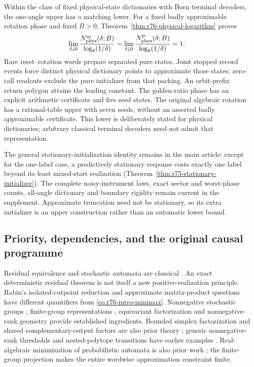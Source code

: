 Within the class of fixed physical-state dictionaries with Born terminal
decoders, the one-angle upper has a matching lower. For a fixed badly
approximable rotation phase and fixed $B>0$,
Theorem~\ref{thm:r76-physical-logarithm} proves
\[
 \lim_{\delta\downarrow0}
 \frac{N_{\rm phys}^{\rm m}(\delta;B)}{\log_8(1/\delta)}
 =\lim_{\delta\downarrow0}
 \frac{N_{\rm phys}^{\rm p}(\delta;B)}{\log_8(1/\delta)}=1.
\]
Rare reset--rotation words prepare separated pure states. Joint stopped
record events force distinct physical dictionary points to approximate
those states; zero-call readouts exclude the pure initializer from that
packing. An orbit-prefix return polygon attains the leading constant.
The golden-ratio phase has an explicit arithmetic certificate and five
seed states. The original algebraic rotation has a rational-table upper
with seven seeds, without an asserted badly approximable certificate.
This lower is deliberately stated for physical dictionaries; arbitrary
classical terminal decoders need not admit that representation.

The general stationary-initialization identity remains in the main
article: except for the one-label case, a predictively stationary
response costs exactly one label beyond its least mixed-start
realization (Theorem~\ref{thm:r75-stationary-initializer}). The complete
noisy-instrument laws, exact sector and worst-phase counts, all-angle
dictionary and boundary rigidity remain current in the supplement.
Approximate truncation need not be stationary, so its extra initializer
is an upper construction rather than an automatic lower bound.

\subsection*{Priority, dependencies, and the original causal programme}

Residual equivalence and stochastic automata are classical
\cite{RabinScott59,Rabin63,Heller65,CarlylePaz71}. An exact deterministic
residual theorem is not itself a new positive-realization principle.
Rabin's isolated-cutpoint reduction and approximate matrix-product
questions have different quantifiers from
\eqref{eq:r76-intro-minimax}. Nonnegative stochastic groups
\cite{Schwarz64,Flor69,Brown64,Schwarz62}, finite-group representations
\cite{Serre77}, equivariant factorization and nonnegative-rank geometry
\cite{GPT13,KPT10,BocciCarliniRapallo11,GillisGlineur12} provide
established ingredients. Bounded simplex factorization and shared
complementary-output factors are also prior theory
\cite{VuThanhGillisLecron23}; generic nonnegative-rank thresholds and
nested-polytope transitions have earlier examples \cite{Gillis12}. Real-algebraic minimization of probabilistic
automata is also prior work \cite{KieferWachter14}; the finite-group
projection makes the entire wordwise approximation constraint finite.

